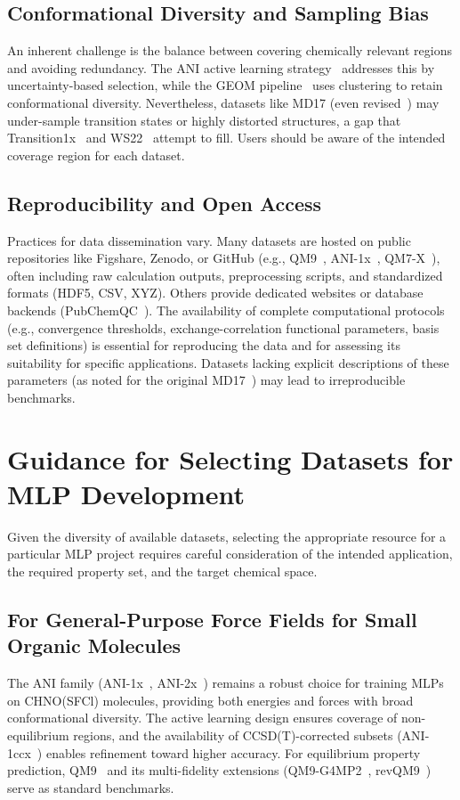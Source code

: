 \documentclass[12pt]{article}
\begin{document}
\subsection*{Conformational Diversity and Sampling Bias}
An inherent challenge is the balance between covering chemically relevant regions and avoiding redundancy. The ANI active learning strategy~\cite{ds26-3} addresses this by uncertainty-based selection, while the GEOM pipeline~\cite{ds34-16} uses clustering to retain conformational diversity. Nevertheless, datasets like MD17 (even revised~\cite{ds20-19}) may under-sample transition states or highly distorted structures, a gap that Transition1x~\cite{ds28-47} and WS22~\cite{ds23-50} attempt to fill. Users should be aware of the intended coverage region for each dataset.

\subsection*{Reproducibility and Open Access}
Practices for data dissemination vary. Many datasets are hosted on public repositories like Figshare, Zenodo, or GitHub (e.g., QM9~\cite{ds1-1}, ANI-1x~\cite{ds26-142}, QM7-X~\cite{ds6-81}), often including raw calculation outputs, preprocessing scripts, and standardized formats (HDF5, CSV, XYZ). Others provide dedicated websites or database backends (PubChemQC~\cite{ds13-28}). The availability of complete computational protocols (e.g., convergence thresholds, exchange-correlation functional parameters, basis set definitions) is essential for reproducing the data and for assessing its suitability for specific applications. Datasets lacking explicit descriptions of these parameters (as noted for the original MD17~\cite{ds20-18}) may lead to irreproducible benchmarks.

\section{Guidance for Selecting Datasets for MLP Development}

Given the diversity of available datasets, selecting the appropriate resource for a particular MLP project requires careful consideration of the intended application, the required property set, and the target chemical space.

\subsection*{For General-Purpose Force Fields for Small Organic Molecules}
The ANI family (ANI-1x~\cite{ds26-3}, ANI-2x~\cite{ds27-8}) remains a robust choice for training MLPs on CHNO(SFCl) molecules, providing both energies and forces with broad conformational diversity. The active learning design ensures coverage of non-equilibrium regions, and the availability of CCSD(T)-corrected subsets (ANI-1ccx~\cite{ds26-3}) enables refinement toward higher accuracy. For equilibrium property prediction, QM9~\cite{ds1-1} and its multi-fidelity extensions (QM9-G4MP2~\cite{ds2-36}, revQM9~\cite{ds4-42}) serve as standard benchmarks.
\end{document}
